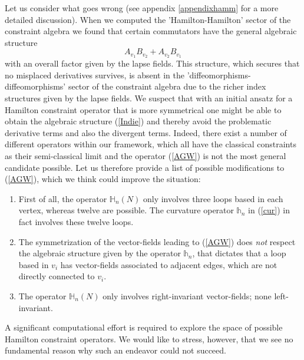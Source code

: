 \documentclass[12pt]{article}
\begin{document}
Let us consider what goes wrong (see appendix \ref{appendixhamm} for a more detailed discussion). When we computed the 'Hamilton-Hamilton' sector of the constraint algebra we found that certain commutators have the general algebraic structure 
\begin{equation}
A_{v_1} B_{v_2} + A_{v_2} B_{v_1}
\label{Indie}
\end{equation}
with an overall factor given by the lapse fields. This structure, which secures that no misplaced derivatives survives, is absent in the 'diffeomorphisms-diffeomorphisms' sector of the constraint algebra due to the richer index structures given by the lapse fields. We suspect that with an initial ansatz for a Hamilton constraint operator that is more symmetrical one might be able to obtain the algebraic structure (\ref{Indie}) and thereby avoid the problematic derivative terms and also the divergent terms.
Indeed, there exist a number of different operators within our framework, which all have the classical constraints as their semi-classical limit and the operator (\ref{AGW}) is not the most general candidate possible. Let us therefore provide a list of possible modifications to (\ref{AGW}), which we think could improve the situation:
\begin{enumerate}
\item
First of all, the operator $\mathds{H}_n(N)$ only involves three loops based in each vertex, whereas twelve are possible. The curvature operator $\mathds{h}_n$ in (\ref{cur}) in fact involves these twelve loops.
\item
The symmetrization of the vector-fields leading to (\ref{AGW}) does {\it not} respect the algebraic structure given by the operator $\mathds{h}_n$, that dictates that a loop based in $v_i$ has vector-fields associated to adjacent edges, which are not directly connected to $v_i$.
\item
The operator $\mathds{H}_n(N)$ only involves right-invariant vector-fields; none left-invariant.
\end{enumerate}
 A significant computational effort is required to explore the space of possible Hamilton constraint operators. We would like to stress, however, that we see no fundamental reason why such an endeavor could not succeed.\\
\end{document}

